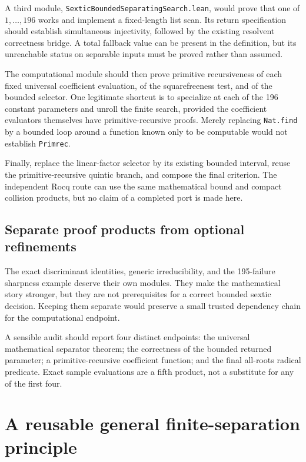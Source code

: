 \documentclass[11pt,letterpaper]{article}
\numberwithin{equation}{section}
\theoremstyle{definition}
\theoremstyle{remark}
\newcommand{\src}[1]{\texttt{\nolinkurl{#1}}}
\begin{document}
A third module, \src{SexticBoundedSeparatingSearch.lean}, would prove that
one of $1,\ldots,196$ works and implement a fixed-length list scan. Its
return specification should establish simultaneous injectivity, followed
by the existing resolvent correctness bridge. A total fallback value can
be present in the definition, but its unreachable status on separable
inputs must be proved rather than assumed.

The computational module should then prove primitive recursiveness of
each fixed universal coefficient evaluation, of the squarefreeness test,
and of the bounded selector. One legitimate shortcut is to specialize at
each of the 196 constant parameters and unroll the finite search, provided
the coefficient evaluators themselves have primitive-recursive proofs.
Merely replacing \src{Nat.find} by a bounded loop around a function known
only to be computable would not establish \src{Primrec}.

Finally, replace the linear-factor selector by its existing bounded
interval, reuse the primitive-recursive quintic branch, and compose the
final criterion. The independent Rocq route can use the same mathematical
bound and compact collision products, but no claim of a completed port is
made here.

\subsection{Separate proof products from optional refinements}

The exact discriminant identities, generic irreducibility, and the
195-failure sharpness example deserve their own modules. They make the
mathematical story stronger, but they are not prerequisites for a correct
bounded sextic decision. Keeping them separate would preserve a small
trusted dependency chain for the computational endpoint.

A sensible audit should report four distinct endpoints: the universal
mathematical separator theorem; the correctness of the bounded returned
parameter; a primitive-recursive coefficient function; and the final
all-roots radical predicate. Exact sample evaluations are a fifth product,
not a substitute for any of the first four.

\section{A reusable general finite-separation principle}
\label{sbr:sec:general}
\end{document}
